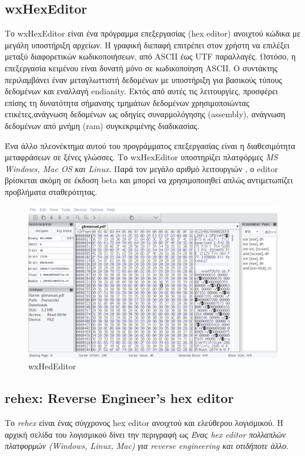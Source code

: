 \pagebreak
\subsection{wxHexEditor}
Το wxHexEditor\cite{wxhex} είναι ένα πρόγραμμα επεξεργασίας (hex editor) ανοιχτού κώδικα με μεγάλη υποστήριξη αρχείων. 
Η γραφική διεπαφή επιτρέπει στον χρήστη να επιλέξει μεταξύ διαφορετικών κωδικοποιήσεων, από ASCII έως UTF παραλλαγές.
Ωστόσο, η επεξεργασία κειμένου είναι δυνατή μόνο σε κωδικοποίηση ASCII.
Ο συντάκτης περιλαμβάνει έναν μεταγλωττιστή δεδομένων με υποστήριξη για βασικούς τύπους δεδομένων και εναλλαγή endianity.
Εκτός από αυτές τις λειτουργίες, προσφέρει επίσης τη δυνατότητα σήμανσης τμημάτων δεδομένων χρησιμοποιώντας ετικέτες,ανάγνωση δεδομένων ως οδηγίες συναρμολόγησης (assembly), ανάγνωση δεδομένων από μνήμη (ram) συγκεκριμένης διαδικασίας.

Ένα άλλο πλεονέκτημα αυτού του προγράμματος επεξεργασίας είναι η διαθεσιμότητα μεταφράσεων σε ξένες γλώσσες.
Το wxHexEditor υποστηρίζει πλατφόρμες \emph{MS Windows, Mac OS και Linux}.
Παρά τον μεγάλο αριθμό λειτουργιών , ο editor βρίσκεται ακόμη σε έκδοση beta και μπορεί να χρησιμοποιηθεί απλώς αντιμετωπίζει προβλήματα σταθερότητας.

\begin{figure}[ht]
\centering
\includegraphics[scale=0.5]{static/wxhex.png}

\caption{wxHedEditor}
\end{figure}

\pagebreak
\subsection{rehex: Reverse Engineer's hex editor}
Το \emph{rehex} \cite{rehex} είναι ένας σύγχρονος hex editor ανοιχτού και ελεύθερου λογισμικού.
H αρχική σελίδα του λογισμικού δίνει την περιγραφή ως \emph{Ένας hex editor πολλαπλών πλατφορμών (Windows, Linux, Mac) για reverse engineering και οτιδήποτε άλλο}.

